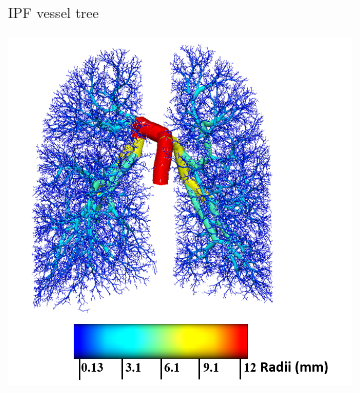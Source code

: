 \begin{figure}[htbp]
\begin{subfigure}{.48\linewidth}
  \caption{IPF vessel tree}
  \label{fig:VesselTreeGeometry-a} 
\end{subfigure}
\hspace{.1in} %
\begin{subfigure}{.48\linewidth}%
  \includegraphics[width=\linewidth,trim={{.0\wd0} {.0\wd0} {.0\wd0} {.0\wd0}},clip]{ModelBasedAnalysis/Image/IPF405_ArteryRadius_Normal.png}

\end{subfigure}
\end{figure}
